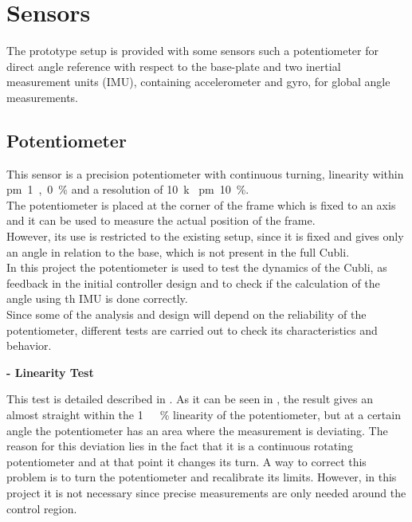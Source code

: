 \section{Sensors}
\label{sec:Sensors}
The prototype setup is provided with some sensors such a potentiometer for direct angle reference with respect to the base-plate and two inertial measurement units (IMU), containing accelerometer and gyro, for global angle measurements.

\subsection{Potentiometer}
This sensor is a precision potentiometer with continuous turning, linearity within \si{\pm1,0\%} and a resolution of \SI{10}{k\Omega} \si{\pm10\%}.\\
The potentiometer is placed at the corner of the frame which is fixed to an axis and it can be used to measure the actual position of the frame.\\
However, its use is restricted to the existing setup, since it is fixed and gives only an angle in relation to the base, which is not present in the full Cubli.\\
In this project the potentiometer is used to test the dynamics of the Cubli, as feedback in the initial controller design and to check if the calculation of the angle using th IMU is done correctly.\\
Since some of the analysis and design will depend on the reliability of the potentiometer, different tests are carried out to check its characteristics and behavior.
%

\textbf{- Linearity Test}

This test is detailed described in . As it can be seen in , the result gives an almost straight within the \si{1\ \%} linearity of the potentiometer, but at a certain angle the potentiometer has an area where the measurement is deviating. The reason for this deviation lies in the fact that it is a continuous rotating potentiometer and at that point it changes its turn. A way to correct this problem is to turn the potentiometer and recalibrate its limits. However, in this project it is not necessary since precise measurements are only needed around the control region.

